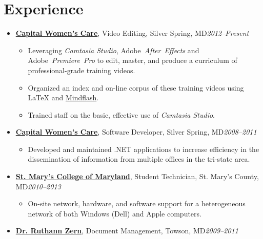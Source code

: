 \documentclass[11pt,letterpaper]{article}
\makeatletter
\newcommand{\position}[5]{\item%
  \begin{tabular*}{1.0\linewidth}{l@{\extracolsep{\fill}}r}
    #1 & #2\\
    \textit{#3} & \textit{#4---#5}
  \end{tabular*}}
\renewcommand{\position}[5]{\item%
  \textbf{#1}, #3, #2\hfill \textit{#4--#5}
}
\newcommand{\cwc}{\href{http://www.cwcare.net}{Capital Women's Care}}
\newcommand{\software}[1]{\textsl{#1}}
\makeatother
\begin{document}
\section*{Experience}
\begin{itemize}
\position \cwc
          {Silver Spring, MD}
          {Video Editing}
          {2012}{Present}
          \begin{itemize}
          \item Leveraging \software{Camtasia Studio},
            Adobe~\software{After~Effects} and
            Adobe~\software{Premiere~Pro} to edit, master, and produce
            a curriculum of professional-grade training videos.
          \item Organized an index and on-line corpus of these training
            videos using \LaTeX{} and
            \href{http://www.mindflash.com/}{Mindflash}.
          \item Trained staff on the basic, effective use of
            \software{Camtasia Studio}.
          \end{itemize}

\position \cwc
          {Silver Spring, MD}
          {Software Developer}
          {2008}{2011}
          \begin{itemize}
          \item Developed and maintained .NET applications to increase
            efficiency in the dissemination of information from
            multiple offices in the tri-state area.
          \end{itemize}

\position {\href{http://oit.smcm.edu}
                {St. Mary's College of Maryland}}
          {St. Mary's County, MD}
          {Student Technician}
          {2010}{2013}
          \begin{itemize}
          \item On-site network, hardware, and software support for a
            heterogeneous network of both Windows (Dell) and Apple
            computers.
          \end{itemize}

\position {\href{http://www.cwcare.net/Provider.aspx?pid=1269}
                {Dr. Ruthann Zern}}
          {Towson, MD}
          {Document Management}
          {2009}{2011}
\end{itemize}
\end{document}
